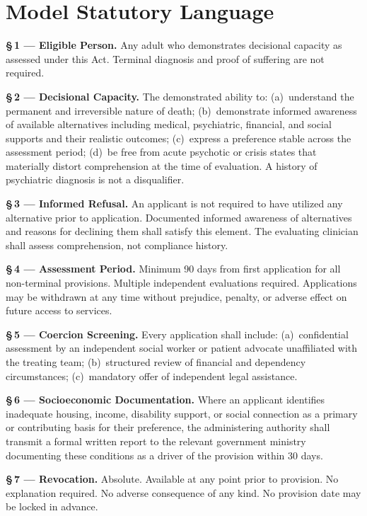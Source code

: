 \documentclass[11pt, letterpaper]{article}
\begin{document}
\section{Model Statutory Language}

\begin{statutebox}
\sffamily\small\setlength{\parskip}{0.55em}

\textbf{\S\,1 --- Eligible Person.}
Any adult who demonstrates decisional capacity as assessed under this Act.
Terminal diagnosis and proof of suffering are not required.

\textbf{\S\,2 --- Decisional Capacity.}
The demonstrated ability to: (a)~understand the permanent and irreversible nature of
death; (b)~demonstrate informed awareness of available alternatives including medical,
psychiatric, financial, and social supports and their realistic outcomes; (c)~express a
preference stable across the assessment period; (d)~be free from acute psychotic or
crisis states that materially distort comprehension at the time of evaluation.
A history of psychiatric diagnosis is not a disqualifier.

\textbf{\S\,3 --- Informed Refusal.}
An applicant is not required to have utilized any alternative prior to application.
Documented informed awareness of alternatives and reasons for declining them shall
satisfy this element. The evaluating clinician shall assess comprehension, not
compliance history.

\textbf{\S\,4 --- Assessment Period.}
Minimum 90 days from first application for all non-terminal provisions.
Multiple independent evaluations required. Applications may be withdrawn at any time
without prejudice, penalty, or adverse effect on future access to services.

\textbf{\S\,5 --- Coercion Screening.}
Every application shall include: (a)~confidential assessment by an independent social
worker or patient advocate unaffiliated with the treating team; (b)~structured review of
financial and dependency circumstances; (c)~mandatory offer of independent legal assistance.

\textbf{\S\,6 --- Socioeconomic Documentation.}
Where an applicant identifies inadequate housing, income, disability support, or social
connection as a primary or contributing basis for their preference, the administering
authority shall transmit a formal written report to the relevant government ministry
documenting these conditions as a driver of the provision within 30 days.

\textbf{\S\,7 --- Revocation.}
Absolute. Available at any point prior to provision. No explanation required. No adverse
consequence of any kind. No provision date may be locked in advance.


\end{statutebox}
\end{document}
